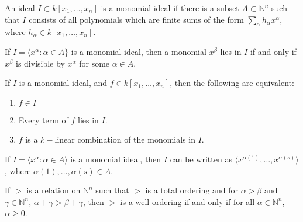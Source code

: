 \documentclass[crop=false,class=book]{standalone}
\begin{document}
\begin{definition}
An ideal $I\subset k[x_1,\hdots ,x_n]$ is a monomial ideal if there is a subset $A\subset \mathbb{N}^n$ such that $I$ consists of all polynomials which are finite sums of the form $\sum_{\alpha} h_{\alpha} x^\alpha$, where $h_{\alpha} \in k[x_1,\hdots ,x_n]$. 
\end{definition}
\begin{theorem}
If $I=\langle x^\alpha: \alpha \in A\}$ is a monomial ideal, then a monomial $x^\beta$ lies in $I$ if and only if $x^\beta$ is divisible by $x^\alpha$ for some $\alpha \in A$.
\end{theorem}
\begin{theorem}
If $I$ is a monomial ideal, and $f\in k[x_1,\hdots ,x_n]$, then the following are equivalent:
\begin{enumerate}
        \item $f\in I$
        \item Every term of $f$ lies in $I$.
        \item $f$ is a $k-$linear combination of the monomials in $I$.
\end{enumerate}
\end{theorem}
\begin{theorem}
If $I=\langle x^\alpha: \alpha \in A\rangle$ is a monomial ideal, then $I$ can be written as $\langle x^{\alpha(1)}, \hdots, x^{\alpha(s)}\rangle$, where $\alpha(1),\hdots, \alpha(s) \in A$. 
\end{theorem}
\begin{theorem}
If $>$ is a relation on $\mathbb{N}^n$ such that $>$ is a total ordering and for $\alpha>\beta$ and $\gamma\in \mathbb{N}^n$, $\alpha+\gamma>\beta+\gamma$, then $>$ is a well-ordering if and only if for all $\alpha \in \mathbb{N}^n$, $\alpha \geq 0$.
\end{theorem}
\end{document}
